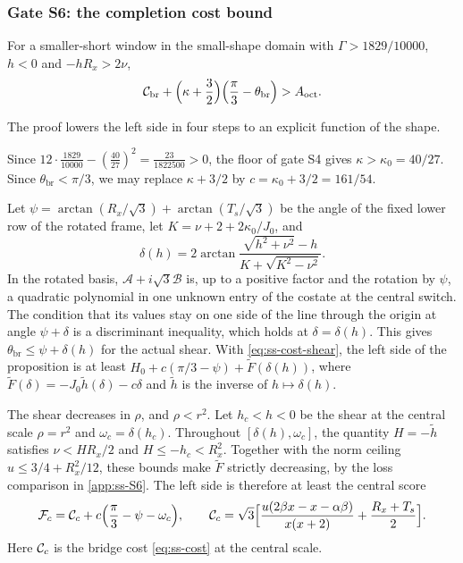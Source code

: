 \subsubsection{Gate S6: the completion cost bound}\label{sec:ss-S6}

\begin{proposition}[Gate S6]\label{prop:ss-S6}
For a smaller-short window in the small-shape domain with $\Gamma>1829/10000$, $h<0$ and
$-hR_x>2\nu$,
\[
  \mathcal{C}_{\mathrm{br}}+\Bigl(\kappa+\frac32\Bigr)\Bigl(\frac\pi3-\theta_{\mathrm{br}}\Bigr)>A_{\mathrm{oct}} .
\]
\end{proposition}

The proof lowers the left side in four steps to an explicit function of the shape.

 Since $12\cdot\frac{1829}{10000}-(\frac{40}{27})^2
=\frac{23}{1822500}>0$, the floor of gate S4 gives $\kappa>\kappa_0=40/27$. Since
$\theta_{\mathrm{br}}<\pi/3$, we may replace $\kappa+3/2$ by $c=\kappa_0+3/2=161/54$.

 Let $\psi=\arctan(R_x/\sqrt3)+\arctan(T_s/\sqrt3)$
be the angle of the fixed lower row of the rotated frame, let $K=\nu+2+2\kappa_0/J_0$, and
\[
  \delta(h)=2\arctan\frac{\sqrt{h^2+\nu^2}-h}{K+\sqrt{K^2-\nu^2}}.
\]
In the rotated basis, $\mathcal A+i\sqrt3\mathcal B$ is, up to a positive factor and the rotation
by $\psi$, a quadratic polynomial in one unknown entry of the costate at the central switch. The
condition that its values stay on one side of the line through the origin at angle $\psi+\delta$
is a discriminant inequality, which holds at $\delta=\delta(h)$. This gives
$\theta_{\mathrm{br}}\le\psi+\delta(h)$ for the actual shear. With
\eqref{eq:ss-cost-shear}, the left side of the proposition is at least
$H_0+c(\pi/3-\psi)+\tilde F(\delta(h))$, where $\tilde F(\delta)=-J_0\tilde h(\delta)-c\delta$ and
$\tilde h$ is the inverse of $h\mapsto\delta(h)$.

 The shear decreases in $\rho$, and $\rho<r^2$.
Let $h_c<h<0$ be the shear at the central scale $\rho=r^2$ and $\omega_c=\delta(h_c)$.
Throughout $[\delta(h),\omega_c]$, the quantity $H=-\tilde h$ satisfies
$\nu<HR_x/2$ and $H\le-h_c<R_x^2$. Together with the norm ceiling
$u\le3/4+R_x^2/12$, these bounds make $\tilde F$ strictly decreasing, by the
loss comparison in \cref{app:ss-S6}. The left side is therefore at least the central score
\[
  \mathcal F_c=\mathcal{C}_c+c\Bigl(\frac\pi3-\psi-\omega_c\Bigr),\qquad
  \mathcal{C}_c=\sqrt3\Bigl[\frac{u(2\beta x-x-\alpha\beta)}{x(x+2)}+\frac{R_x+T_s}{2}\Bigr] .
\]
Here $\mathcal{C}_c$ is the bridge cost \eqref{eq:ss-cost} at the
central scale.

